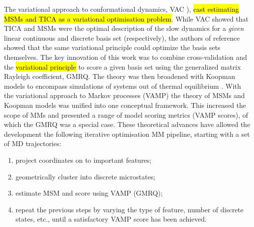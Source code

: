 
The variational approach to conformational dynamics, VAC \cite{nuskeVariationalApproachMolecular2014}), \hl{cast estimating MSMs and TICA as a variational optimisation problem}. While VAC showed that TICA and MSMs were the optimal description of the slow dynamics for a \emph{given} linear continuous and discrete basis set (respectively), the authors of reference \cite{mcgibbonVariationalCrossvalidationSlow2015} showed that the same variational principle could optimize the basis sets themselves. The key innovation of this work was to combine cross-validation \cite{arlotSurveyCrossvalidationProcedures2009} and the \hl{variational principle} to score a given basis set using the generalized matrix Rayleigh coefficient, GMRQ. The theory was then broadened with Koopman models to encompass simulations of systems out of thermal equilibrium \cite{wuVariationalKoopmanModels2017}. With the variational approach to Markov processes (VAMP) the theory of MSMs and Koopman models was unified into one conceptual framework. This increased the scope of MMs and presented a range of model scoring metrics (VAMP scores), of which the GMRQ was a special case. These theoretical advances have allowed the development the following iterative optimisation MM pipeline, starting with a set of MD trajectories:

\begin{enumerate}
    \item project coordinates on to important features;
    \item geometrically cluster into discrete microstates;
    \item estimate MSM and score using VAMP (GMRQ);
    \item repeat the previous steps by varying the type of feature, number of discrete states, etc., until a satisfactory VAMP score has been achieved.   
\end{enumerate}

